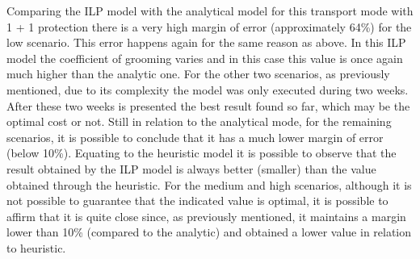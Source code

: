 Comparing the ILP model with the analytical model for this transport mode with 1 + 1 protection there is a very high margin of error (approximately 64\%) for the low scenario. This error happens again for the same reason as above. In this ILP model the coefficient of grooming varies and in this case this value is once again much higher than the analytic one.
For the other two scenarios, as previously mentioned, due to its complexity the model was only executed during two weeks. After these two weeks is presented the best result found so far, which may be the optimal cost or not.
Still in relation to the analytical mode, for the remaining scenarios, it is possible to conclude that it has a much lower margin of error (below 10\%).
Equating to the heuristic model it is possible to observe that the result obtained by the ILP model is always better (smaller) than the value obtained through the heuristic.
For the medium and high scenarios, although it is not possible to guarantee that the indicated value is optimal, it is possible to affirm that it is quite close since, as previously mentioned, it maintains a margin lower than 10\% (compared to the analytic) and obtained a lower value in relation to heuristic.
